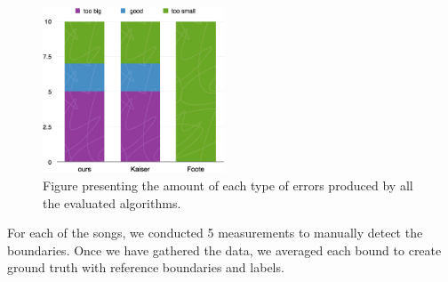 \begin{figure}
\vspace{-10pt}
  \begin{center}
    \includegraphics[width=0.48\textwidth]{Figures/count}
  \end{center}
  \caption{Figure presenting the amount of each type of errors produced by all the evaluated algorithms.}
\label{fig:boundcount}
\end{figure}

For each of the songs, we conducted 5 measurements to manually detect the boundaries. Once we have gathered the data, we averaged each bound to create ground truth with reference boundaries and labels.



